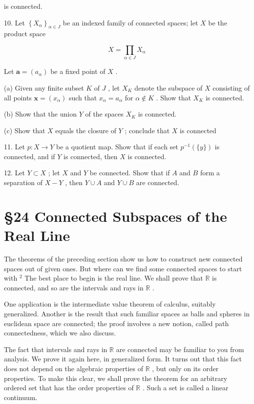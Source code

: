 is connected.

10. Let \({\left\{  {X}_{\alpha }\right\}  }_{\alpha  \in  J}\) be an indexed family of connected spaces; let \(X\) be the product space

\[
X = \mathop{\prod }\limits_{{\alpha  \in  J}}{X}_{\alpha }
\]

Let \(\mathbf{a} = \left( {a}_{\alpha }\right)\) be a fixed point of \(X\) .

(a) Given any finite subset \(K\) of \(J\) , let \({X}_{K}\) denote the subspace of \(X\) consisting of all points \(\mathbf{x} = \left( {x}_{\alpha }\right)\) such that \({x}_{\alpha } = {a}_{\alpha }\) for \(\alpha  \notin  K\) . Show that \({X}_{K}\) is connected.

(b) Show that the union \(Y\) of the spaces \({X}_{K}\) is connected.

(c) Show that \(X\) equals the closure of \(Y\) ; conclude that \(X\) is connected

11. Let \(p : X \rightarrow  Y\) be a quotient map. Show that if each set \({p}^{-1}\left( {\{ y\} }\right)\) is connected, and if \(Y\) is connected, then \(X\) is connected.

12. Let \(Y \subset  X\) ; let \(X\) and \(Y\) be connected. Show that if \(A\) and \(B\) form a separation of \(X - Y\) , then \(Y \cup  A\) and \(Y \cup  B\) are connected.

\section*{§24 Connected Subspaces of the Real Line}

The theorems of the preceding section show us how to construct new connected spaces out of given ones. But where can we find some connected spaces to start with \({}^{2}\) The best place to begin is the real line. We shall prove that \(\mathbb{R}\) is connected, and so are the intervals and rays in \(\mathbb{R}\) .

One application is the intermediate value theorem of calculus, suitably generalized. Another is the result that such familiar spaces as balls and spheres in euclidean space are connected; the proof involves a new notion, called path connectedness, which we also discuss.

The fact that intervals and rays in \(\mathbb{R}\) are connected may be familiar to you from analysis. We prove it again here, in generalized form. It turns out that this fact does not depend on the algebraic properties of \(\mathbb{R}\) , but only on its order properties. To make this clear, we shall prove the theorem for an arbitrary ordered set that has the order properties of \(\mathbb{R}\) . Such a set is called a linear continuum.

